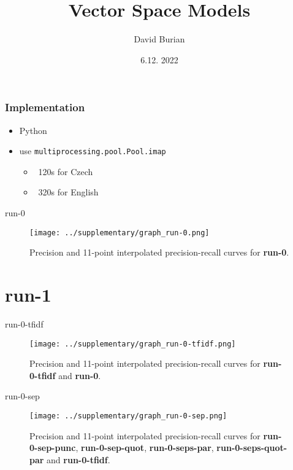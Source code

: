\documentclass{beamer}
\title{Vector Space Models}
\author{David Burian}
\date{6.12. 2022}
\newcommand{\Run}[1]{\textbf{#1}}
\let\Oldinput
\renewcommand{}[1]{\resizebox{\textwidth}{!}{\Oldinput{#1}}}
\begin{document}
\frame{\titlepage}

\begin{frame}
\frametitle{Implementation}
\begin{itemize}
    \item Python
    \item use \texttt{multiprocessing.pool.Pool.imap}
        \begin{itemize}
            \item ~120s for Czech
            \item ~320s for English
        \end{itemize}
\end{itemize}
\end{frame}

\begin{frame}{run-0}
\begin{table}[h]

\caption{Results of \Run{run-0}.\label{tbl:run-0}}
\end{table}

\begin{figure}[h]
\texttt{[image: ../supplementary/graph\_run-0.png]}
\caption{Precision and 11-point interpolated precision-recall curves for
\Run{run-0}.\label{fig:run-0}}
\end{figure}
\end{frame}

\section{run-1}
\begin{frame}{run-0-tfidf}
\begin{table}[h]

\caption{Results of \Run{run-0-tfidf} and \Run{run-0}.\label{tbl:run-0-tfidf}}
\end{table}

\begin{figure}[h]
\texttt{[image: ../supplementary/graph\_run-0-tfidf.png]}
\caption{Precision and 11-point interpolated precision-recall curves for
    \Run{run-0-tfidf} and \Run{run-0}.\label{fig:run-0-tfidf}}
\end{figure}
\end{frame}

\begin{frame}{run-0-sep}
\begin{table}[h]

    \caption{Results of
    \Run{run-0-sep-punc}, \Run{run-0-sep-quot}, \Run{run-0-seps-par},
    \Run{run-0-seps-quot-par} and \Run{run-0-tfidf}.\label{tbl:run-0-sep}}
\end{table}

\begin{figure}[h]
\texttt{[image: ../supplementary/graph\_run-0-sep.png]}
    \caption{Precision and 11-point interpolated precision-recall curves for
    \Run{run-0-sep-punc}, \Run{run-0-sep-quot}, \Run{run-0-seps-par},
    \Run{run-0-seps-quot-par} and \Run{run-0-tfidf}.\label{fig:run-0-sep}}
\end{figure}
\end{frame}
\end{document}
